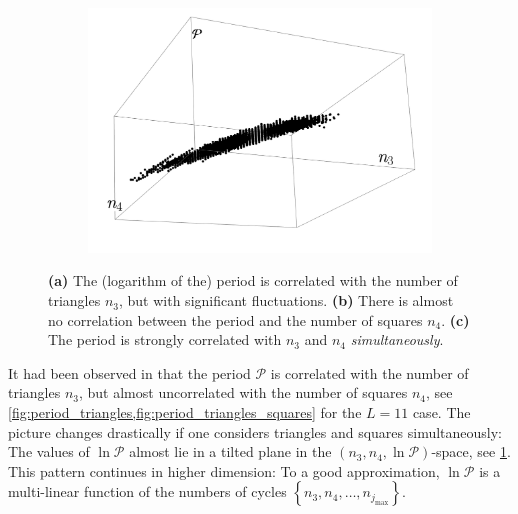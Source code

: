 \documentclass[12pt]{article}
\numberwithin{equation}{section}
\newcommand{\period}{\mathcal P}
\begin{document}
\begin{figure}[htb]
\begin{subfigure}[b]{.32 \textwidth}
		\includegraphics[width=\linewidth]{figures/period_3d}
		\subcaption{}
		\label{fig:period_cycles_3d}
	\end{subfigure}
	
	\caption{ \textbf{(a)} The (logarithm of the) period is correlated with the number of triangles $n_3$, but with significant fluctuations. \textbf{(b)} There is almost no correlation between the period and the number of squares $n_4$.  \textbf{(c)} The period is strongly correlated with $n_3$ and $n_4$ \emph{simultaneously}. }
	 	\label{fig:cycles_34}
\end{figure}

It had been observed in \cite{balduf_statistics_2023}  that the period $\period$ is correlated with the number of triangles $n_3$, but almost uncorrelated with the number of squares $n_4$, see \cref{fig:period_triangles,fig:period_triangles_squares} for the $L=11$ case. The picture changes drastically if one considers triangles and squares simultaneously: The values of $\ln \period$ almost lie in a tilted plane in the $(n_3,n_4,\ln \period)$-space, see \cref{fig:period_cycles_3d}.
This pattern continues  in higher dimension: To a good approximation, $\ln \period$ is a multi-linear function of the numbers of cycles $\left \lbrace n_3,n_4,\ldots, n_{j_\text{max}} \right \rbrace   $. 
\end{document}
